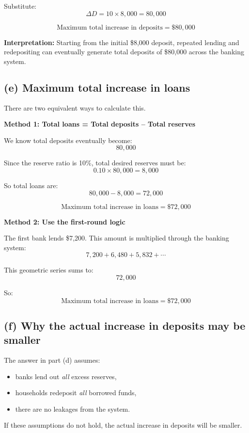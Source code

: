 \documentclass[12pt]{article}
\begin{document}
Substitute:
\[
\Delta D = 10 \times 8{,}000 = 80{,}000
\]

\[
\boxed{\text{Maximum total increase in deposits} = \$80{,}000}
\]

\textbf{Interpretation:} Starting from the initial \$8{,}000 deposit, repeated lending and redepositing can eventually generate total deposits of \$80{,}000 across the banking system.

\subsection*{(e) Maximum total increase in loans}

There are two equivalent ways to calculate this.

\textbf{Method 1: Total loans = Total deposits -- Total reserves}

We know total deposits eventually become:
\[
80{,}000
\]

Since the reserve ratio is 10\%, total desired reserves must be:
\[
0.10 \times 80{,}000 = 8{,}000
\]

So total loans are:
\[
80{,}000 - 8{,}000 = 72{,}000
\]

\[
\boxed{\text{Maximum total increase in loans} = \$72{,}000}
\]

\textbf{Method 2: Use the first-round logic}

The first bank lends \$7{,}200. This amount is multiplied through the banking system:
\[
7{,}200 + 6{,}480 + 5{,}832 + \cdots
\]

This geometric series sums to:
\[
72{,}000
\]

So:
\[
\boxed{\text{Maximum total increase in loans} = \$72{,}000}
\]

\subsection*{(f) Why the actual increase in deposits may be smaller}

The answer in part (d) assumes:
\begin{itemize}
    \item banks lend out \emph{all} excess reserves,
    \item households redeposit \emph{all} borrowed funds,
    \item there are no leakages from the system.
\end{itemize}

If these assumptions do not hold, the actual increase in deposits will be smaller.
\end{document}
